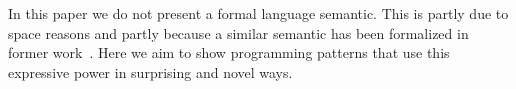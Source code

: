 In this paper we do not present a formal language semantic. This is partly due to space reasons
and partly because a similar semantic has been formalized in former work~\cite{servetto2014meta}.
Here we aim to show programming patterns that use this expressive power in surprising and novel ways.



